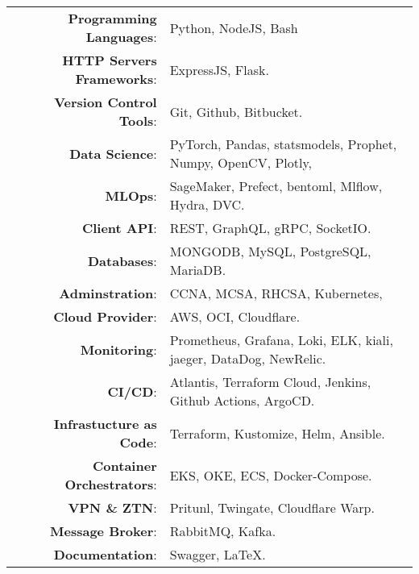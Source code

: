 \documentclass[a4paper,10pt]{article}
\begin{document}
\begin{longtable}{r p{16cm}}	
    \textbf{Programming Languages}:& Python, NodeJS, Bash\\
    \textbf{HTTP Servers Frameworks}:& ExpressJS, Flask.\\
    \textbf{Version Control Tools}:& Git, Github, Bitbucket.\\
    \textbf{Data Science}:& PyTorch, Pandas, statsmodels, Prophet, Numpy, OpenCV, Plotly,\\
    \textbf{MLOps}:& SageMaker, Prefect, bentoml, Mlflow, Hydra, DVC.\\
    \textbf{Client API}:& REST, GraphQL, gRPC, SocketIO.\\
    \textbf{Databases}:& MONGODB, MySQL, PostgreSQL, MariaDB.\\
    \textbf{Adminstration}:& CCNA, MCSA, RHCSA, Kubernetes,\\
    \textbf{Cloud Provider}:& AWS, OCI, Cloudflare. \\
    \textbf{Monitoring}:& Prometheus, Grafana, Loki, ELK, kiali, jaeger, DataDog, NewRelic.\\ 
    \textbf{CI/CD}:& Atlantis, Terraform Cloud, Jenkins, Github Actions, ArgoCD.\\
    \textbf{Infrastucture as Code}:& Terraform, Kustomize, Helm, Ansible.\\
    \textbf{Container Orchestrators}:& EKS, OKE, ECS, Docker-Compose. \\
    \textbf{VPN \& ZTN}:& Pritunl, Twingate, Cloudflare Warp. \\
    \textbf{Message Broker}:& RabbitMQ, Kafka.\\
    \textbf{Documentation}:& Swagger, \LaTeX.\\
\end{longtable}
\label{LastPage}
\end{document}
